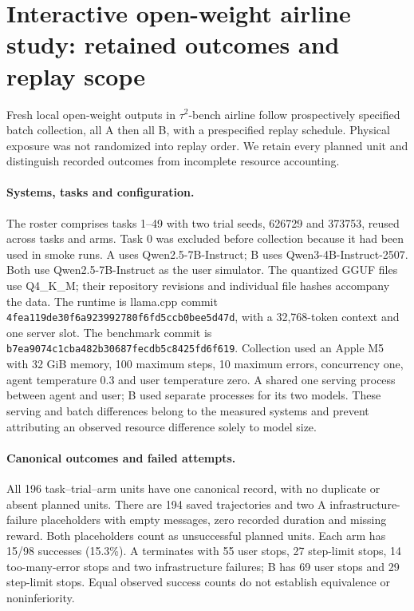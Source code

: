 \section{Interactive open-weight airline study: retained outcomes and replay scope}
\label{app:open_airline}
Fresh local open-weight outputs in $\tau^2$-bench airline
\citep{tau2bench2025} follow prospectively specified batch collection,
all A then all B, with a prespecified replay schedule. Physical exposure
was not randomized into replay order. We retain every planned unit and
distinguish recorded outcomes from incomplete resource accounting.

\paragraph{Systems, tasks and configuration.}
The roster comprises tasks 1--49 with two trial seeds, 626729 and 373753,
reused across tasks and arms. Task 0 was excluded before collection
because it had been used in smoke runs. A uses Qwen2.5-7B-Instruct;
B uses Qwen3-4B-Instruct-2507. Both use Qwen2.5-7B-Instruct as the
user simulator. The quantized GGUF files use Q4\_K\_M; their repository
revisions and individual file hashes accompany the data. The runtime
is llama.cpp commit \texttt{4fea119de30f6a923992780f6fd5ccb0bee5d47d},
with a 32,768-token context and one server slot. The benchmark commit is
\texttt{b7ea9074c1cba482b30687fecdb5c8425fd6f619}.
Collection used an Apple M5 with 32 GiB memory, 100 maximum steps,
10 maximum errors, concurrency one, agent temperature 0.3 and user
temperature zero. A shared one serving process between agent and user;
B used separate processes for its two models. These serving and batch
differences belong to the measured systems and prevent attributing an
observed resource difference solely to model size.

\paragraph{Canonical outcomes and failed attempts.}
All 196 task--trial--arm units have one canonical record, with no duplicate
or absent planned units. There are 194 saved trajectories and two A
infrastructure-failure placeholders with empty messages, zero recorded
duration and missing reward. Both placeholders count as unsuccessful
planned units. Each arm has 15/98 successes (15.3\%). A terminates with
55 user stops, 27 step-limit stops, 14 too-many-error stops and two
infrastructure failures; B has 69 user stops and 29 step-limit stops.
Equal observed success counts do not establish equivalence or noninferiority.

